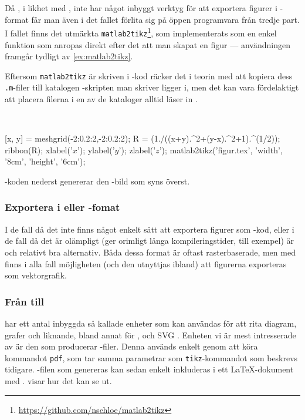 \documentclass[10pt,../../a4.tex]{subfiles}
\begin{document}
\label{sec:matlab2tikz}
Då \MATLAB, i likhet med \Rlogo, inte har något inbyggt verktyg för att
exportera figurer i \PGFTikZ-format får man även i det fallet förlita sig
på öppen programvara från tredje part. I fallet \MATLAB finns det utmärkta
\texttt{matlab2tikz}\footnote{\url{https://github.com/nschloe/matlab2tikz}},
som implementerats som en enkel funktion som anropas direkt efter det
att man skapat en figur — användningen framgår tydligt av \cref{ex:matlab2tikz}.

Eftersom \texttt{matlab2tikz} är skriven i \MATLAB-kod räcker det i
teorin med att kopiera dess \texttt{.m}-filer till katalogen
\MATLAB-skripten man skriver ligger i, men det kan vara fördelaktigt att
placera filerna i en av de kataloger \MATLAB alltid läser in
\parencite{MATLAB13:path}.

\begin{kod}[tbp]
	\centering
	\begin{minipage}{\textwidth}
		\centering
		
	\end{minipage}
	\\[2ex]
	\begin{minipage}{\textwidth}
		\begin{matlabcode}
[x, y] = meshgrid(-2:0.2:2,-2:0.2:2);
R = (1./((x+y).^2+(y-x).^2+1).^(1/2));
ribbon(R);
xlabel('$x$'); ylabel('$y$'); zlabel('$z$');
matlab2tikz('figur.tex', 'width', '8cm', 'height', '6cm');
		\end{matlabcode}
	\end{minipage}
	\caption{\MATLAB-koden nederst genererar den \PGFTikZ-bild som
	syns överst.}
	\label{ex:matlab2tikz}
\end{kod}

\subsubsection{Exportera i \PDF eller \PNG-fomat}
I de fall då det inte finns något enkelt sätt att exportera figurer som
\PGFTikZ-kod, eller i de fall då det är olämpligt (ger orimligt långa
kompileringstider, till exempel) är \PDF och \PNG relativt bra alternativ.
Båda dessa format är oftast rasterbaserade, men med \PDF finns i alla 
fall möjligheten (och den utnyttjas ibland) att figurerna exporteras
som vektorgrafik.

\subsubsection*{Från \Rlogo till \PDF}
\Rlogo har ett antal inbyggda så kallade enheter  som kan
användas för att rita diagram, grafer och liknande, bland annat för \EPS,
\PNG och \textsc{SVG} \parencite[\ppno~675–676]{RCoreTeam12}. Enheten vi är mest
intresserade av är den som producerar \PDF-filer. Denna används enkelt
genom att köra kommandot \texttt{pdf}, som tar samma parametrar som
\texttt{tikz}-kommandot som beskrevs tidigare. \PDF-filen som genereras
kan sedan enkelt inkluderas i ett \LaTeX-dokument med .
 visar hur det kan se ut.
\end{document}
